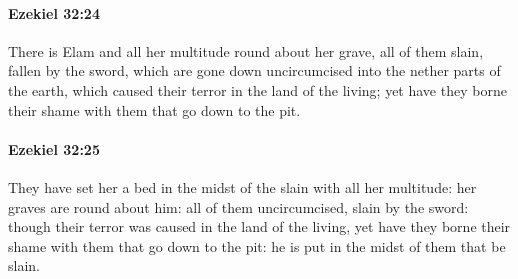 		\paragraph{Ezekiel 32:24} %
			\label{EZEKIEL-32-24}

			There is Elam and all her multitude round about her grave, all of them slain, fallen by the sword, which are gone down uncircumcised into the nether parts of the earth, which caused their terror in the land of the living; yet have they borne their shame with them that go down to the pit.


		\paragraph{Ezekiel 32:25} %
			\label{EZEKIEL-32-25}

			They have set her a bed in the midst of the slain with all her multitude: her graves are round about him: all of them uncircumcised, slain by the sword: though their terror was caused in the land of the living, yet have they borne their shame with them that go down to the pit: he is put in the midst of them that be slain.

